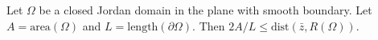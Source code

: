 
Let $\Omega$ be a closed Jordan domain in the plane with smooth boundary. Let $A = \text{area}(\Omega)$ and $L = \text{length}(\partial\Omega)$. Then $2A/L \leq \text{dist}(\bar{z}, R(\Omega))$.
